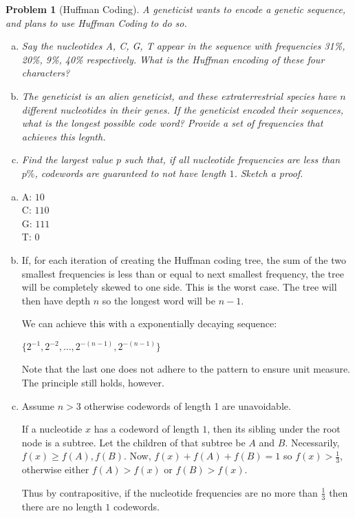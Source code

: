 \documentclass[10pt]{article}
\newtheorem{problem}{\sc\color{cit}Problem}
\begin{document}
\begin{problem}[Huffman Coding]
A geneticist wants to encode a genetic sequence, and plans to use Huffman Coding to do so. 
\begin{enumerate}[(a)]
    \item Say the nucleotides A, C, G, T appear in the sequence with frequencies 31\%, 20\%, 9\%, 40\% respectively. What is the Huffman encoding of these four characters?
    \item The geneticist is an alien geneticist, and these extraterrestrial species have $n$ different nucleotides in their genes. If the geneticist encoded their sequences, what is the longest possible code word? Provide a set of frequencies that achieves this legnth.  
    \item Find the largest value $p$ such that, if all nucleotide frequencies are less than $p\%$, codewords are \textit{guaranteed} to not have length $1$. Sketch a proof.
\end{enumerate}

\end{problem}

\begin{solution}

    \begin{enumerate}[(a)]
        \item {
            A: $10$ \\
            C: $110$ \\
            G: $111$ \\
            T: $0$
        }
        \item {
            If, for each iteration of creating the Huffman coding tree, the 
            sum of the two smallest frequencies is less than or equal to next 
            smallest frequency, the tree will be completely skewed to one side. 
            This is the worst case. 
            The tree will then have depth $n$ so the longest word will be $n-1$. 

            We can achieve this with a exponentially decaying sequence:

            $\{2^{-1}, 2^{-2}, \dots, 2^{-(n-1)}, 2^{-(n-1)}\}$

            Note that the last one does not adhere to the pattern to ensure 
            unit measure. 
            The principle still holds, however. 
        }
        \item {
            Assume $n > 3$ otherwise codewords of length 1 are unavoidable. 

            If a nucleotide $x$ has a codeword of length $1$, then its sibling 
            under the root node is a subtree. 
            Let the children of that subtree be $A$ and $B$. 
            Necessarily, $f(x) \geq f(A), f(B)$. 
            Now, $f(x) + f(A) + f(B) = 1$ so $f(x) > \frac{1}{3}$, otherwise 
            either $f(A) > f(x)$ or $f(B) > f(x)$. 

            Thus by contrapositive, if the nucleotide frequencies are no more 
            than $\frac{1}{3}$ then there are no length $1$ codewords. 

        }
    \end{enumerate}

\end{solution}
\end{document}
